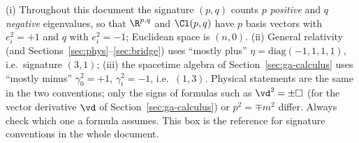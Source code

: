 \begin{pitfall}
(i) Throughout this document the signature $(p,q)$ counts $p$ \emph{positive} and $q$ \emph{negative} eigenvalues,
so that $\R^{p,q}$ and $\Cl(p,q)$ have $p$ basis vectors with $e_i^2=+1$ and $q$ with $e_i^2=-1$; Euclidean space is $(n,0)$.
(ii) General relativity (and Sections~\ref{sec:phys}--\ref{sec:bridge}) uses ``mostly plus'' $\eta=\mathrm{diag}(-1,1,1,1)$, i.e.\ signature
$(3,1)$; (iii) the spacetime algebra of Section~\ref{sec:ga-calculus} uses ``mostly minus'' $\gamma_0^2=+1$, $\gamma_i^2=-1$, i.e.\ $(1,3)$.
Physical statements are the same in the two conventions; only the signs of formulas such as $\vd^2=\pm\Box$ (for the vector
derivative $\vd$ of Section~\ref{sec:ga-calculus}) or
$p^2=\mp m^2$ differ. Always check which one a formula assumes. This box is the reference for signature conventions in the whole document.
\end{pitfall}
